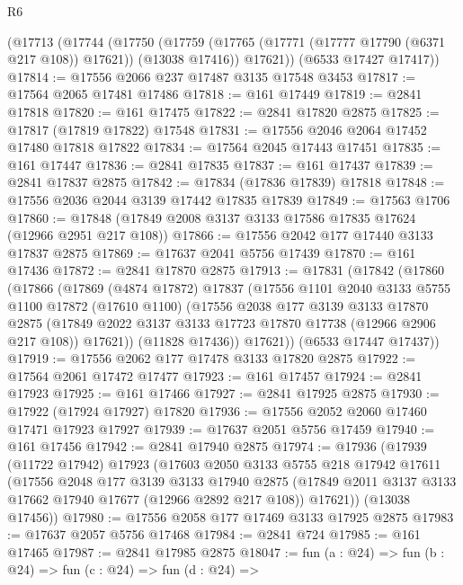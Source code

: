 \begin{lexlean}{R6}
\begin{coremodule}
    (@17713
      (@17744
        (@17750
          (@17759 (@17765 (@17771 (@17777 @17790 (@6371 @217 @108)) @17621)) (@13038 @17416))
          @17621))
      (@6533 @17427 @17417))
@17814 := @17556 @2066 @237 @17487 @3135 @17548 @3453
@17817 := @17564 @2065 @17481 @17486
@17818 := @161 @17449
@17819 := @2841 @17818
@17820 := @161 @17475
@17822 := @2841 @17820 @2875
@17825 := @17817 (@17819 @17822) @17548
@17831 := @17556 @2046 @2064 @17452 @17480 @17818 @17822
@17834 := @17564 @2045 @17443 @17451
@17835 := @161 @17447
@17836 := @2841 @17835
@17837 := @161 @17437
@17839 := @2841 @17837 @2875
@17842 := @17834 (@17836 @17839) @17818
@17848 := @17556 @2036 @2044 @3139 @17442 @17835 @17839
@17849 := @17563 @1706
@17860 := @17848 (@17849 @2008 @3137 @3133 @17586 @17835 @17624 (@12966 @2951 @217 @108))
@17866 := @17556 @2042 @177 @17440 @3133 @17837 @2875
@17869 := @17637 @2041 @5756 @17439
@17870 := @161 @17436
@17872 := @2841 @17870 @2875
@17913 := @17831
    (@17842
      (@17860
        (@17866
          (@17869
            (@4874 @17872)
            @17837
            (@17556
              @1101
              @2040
              @3133
              @5755
              @1100
              @17872
              (@17610 @1100)
              (@17556
                @2038
                @177
                @3139
                @3133
                @17870
                @2875
                (@17849 @2022 @3137 @3133 @17723 @17870 @17738 (@12966 @2906 @217 @108))
                @17621))
            (@11828 @17436))
          @17621))
      (@6533 @17447 @17437))
@17919 := @17556 @2062 @177 @17478 @3133 @17820 @2875
@17922 := @17564 @2061 @17472 @17477
@17923 := @161 @17457
@17924 := @2841 @17923
@17925 := @161 @17466
@17927 := @2841 @17925 @2875
@17930 := @17922 (@17924 @17927) @17820
@17936 := @17556 @2052 @2060 @17460 @17471 @17923 @17927
@17939 := @17637 @2051 @5756 @17459
@17940 := @161 @17456
@17942 := @2841 @17940 @2875
@17974 := @17936
    (@17939
      (@11722 @17942)
      @17923
      (@17603
        @2050
        @3133
        @5755
        @218
        @17942
        @17611
        (@17556
          @2048
          @177
          @3139
          @3133
          @17940
          @2875
          (@17849 @2011 @3137 @3133 @17662 @17940 @17677 (@12966 @2892 @217 @108))
          @17621))
      (@13038 @17456))
@17980 := @17556 @2058 @177 @17469 @3133 @17925 @2875
@17983 := @17637 @2057 @5756 @17468
@17984 := @2841 @724
@17985 := @161 @17465
@17987 := @2841 @17985 @2875
@18047 := fun (a : @24) =>
  fun (b : @24) =>
  fun (c : @24) =>
  fun (d : @24) =>

\end{coremodule}
\end{lexlean}
